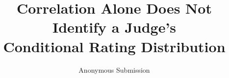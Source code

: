 \documentclass[letterpaper]{article} %
\title{Correlation Alone Does Not Identify a Judge's\\ Conditional Rating Distribution}
\author{Anonymous Submission}
\newif\ifsupplementary
\newif\ifappendices
\begin{document}
\maketitle










\ifappendices
\appendix
\setcounter{secnumdepth}{2}




\ifsupplementary




\fi \fi
\end{document}
